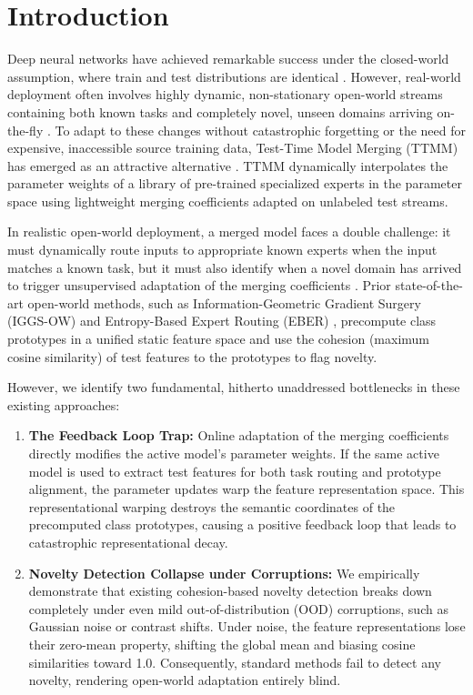 \documentclass{article}
\theoremstyle{plain}
\theoremstyle{definition}
\theoremstyle{remark}
\begin{document}
\section{Introduction}
Deep neural networks have achieved remarkable success under the closed-world assumption, where train and test distributions are identical \cite{He_2016_CVPR, vaswani2017attention}. However, real-world deployment often involves highly dynamic, non-stationary open-world streams containing both known tasks and completely novel, unseen domains arriving on-the-fly \cite{liang2023comprehensive, wang2022continual}. To adapt to these changes without catastrophic forgetting or the need for expensive, inaccessible source training data, Test-Time Model Merging (TTMM) has emerged as an attractive alternative \cite{iggs_ow, fp_ow, dr_fisher}. TTMM dynamically interpolates the parameter weights of a library of pre-trained specialized experts in the parameter space using lightweight merging coefficients adapted on unlabeled test streams.

In realistic open-world deployment, a merged model faces a double challenge: it must dynamically route inputs to appropriate known experts when the input matches a known task, but it must also identify when a novel domain has arrived to trigger unsupervised adaptation of the merging coefficients \cite{iggs_ow, dr_fisher}. Prior state-of-the-art open-world methods, such as Information-Geometric Gradient Surgery (IGGS-OW) \cite{iggs_ow} and Entropy-Based Expert Routing (EBER) \cite{dr_fisher}, precompute class prototypes in a unified static feature space and use the cohesion (maximum cosine similarity) of test features to the prototypes to flag novelty.

However, we identify two fundamental, hitherto unaddressed bottlenecks in these existing approaches:
\begin{enumerate}
    \item \textbf{The Feedback Loop Trap:} Online adaptation of the merging coefficients directly modifies the active model's parameter weights. If the same active model is used to extract test features for both task routing and prototype alignment, the parameter updates warp the feature representation space. This representational warping destroys the semantic coordinates of the precomputed class prototypes, causing a positive feedback loop that leads to catastrophic representational decay.
    \item \textbf{Novelty Detection Collapse under Corruptions:} We empirically demonstrate that existing cohesion-based novelty detection breaks down completely under even mild out-of-distribution (OOD) corruptions, such as Gaussian noise or contrast shifts. Under noise, the feature representations lose their zero-mean property, shifting the global mean and biasing cosine similarities toward 1.0. Consequently, standard methods fail to detect any novelty, rendering open-world adaptation entirely blind.
\end{enumerate}
\end{document}
